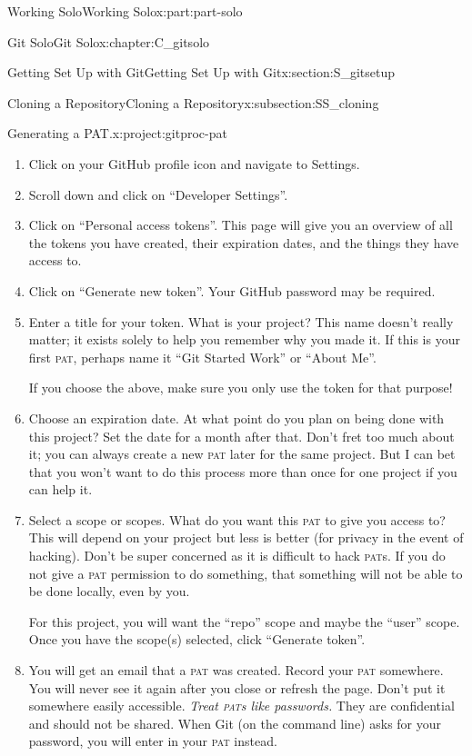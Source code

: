 \documentclass[oneside,10pt,]{book}
\newcommand{\acronym}[1]{\textsc{\MakeLowercase{#1}}}
\DeclareRobustCommand{\acronymintitle}[1]{\texorpdfstring{#1}{#1}}
\begin{document}
\begin{partptx}{Working Solo}{}{Working Solo}{}{}{x:part:part-solo}
\begin{chapterptx}{Git Solo}{}{Git Solo}{}{}{x:chapter:C_gitsolo}
\begin{sectionptx}{Getting Set Up with Git}{}{Getting Set Up with Git}{}{}{x:section:S_gitsetup}
\begin{subsectionptx}{Cloning a Repository}{}{Cloning a Repository}{}{}{x:subsection:SS_cloning}
\begin{project}{Generating a \acronymintitle{PAT}.}{x:project:gitproc-pat}%
\index{github!\acronym{PAT}}%
\begin{enumerate}[font=\bfseries,label=(\alph*),ref=\alph*]
\item{}Click on your GitHub profile icon and navigate to Settings.%
\item{}Scroll down and click on ``Developer Settings''.%
\item{}Click on ``Personal access tokens''. This page will give you an overview of all the tokens you have created, their expiration dates, and the things they have access to.%
\item{}Click on ``Generate new token''. Your GitHub password may be required.%
\item{}Enter a title for your token. What is your project? This name doesn't really matter; it exists solely to help you remember why you made it. If this is your first \acronym{PAT}, perhaps name it ``Git Started Work'' or ``About Me''.%
\par
If you choose the above, make sure you only use the token for that purpose!%
\item{}Choose an expiration date. At what point do you plan on being done with this project? Set the date for a month after that. Don't fret too much about it; you can always create a new \acronym{PAT} later for the same project. But I can bet that you won't want to do this process more than once for one project if you can help it.%
\item{}Select a scope or scopes. What do you want this \acronym{PAT} to give you access to? This will depend on your project but less is better (for privacy in the event of hacking). Don't be super concerned as it is difficult to hack \acronym{PAT}s. If you do not give a \acronym{PAT} permission to do something, that something will not be able to be done locally, even by you.%
\par
For this project, you will want the ``repo'' scope and maybe the ``user'' scope. Once you have the scope(s) selected, click ``Generate token''.%
\item{}You will get an email that a \acronym{PAT} was created. Record your \acronym{PAT} somewhere. You will never see it again after you close or refresh the page. Don't put it somewhere easily accessible. \emph{Treat \acronym{PAT}s like passwords.} They are confidential and should not be shared. When Git (on the command line) asks for your password, you will enter in your \acronym{PAT} instead.%

\end{enumerate}
\end{project}
\end{subsectionptx}
\end{sectionptx}
\end{chapterptx}
\end{partptx}
\end{document}
